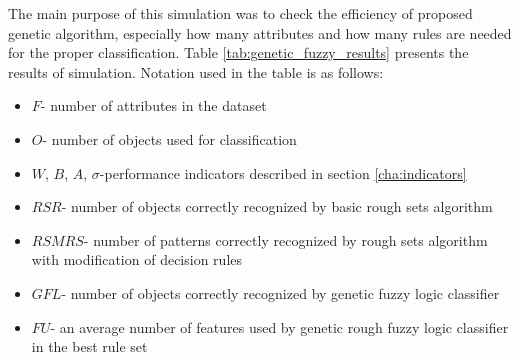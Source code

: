 The main purpose of this simulation was to check the efficiency of proposed
genetic algorithm, especially how many attributes and how many rules are needed 
for the proper classification. Table \ref{tab:genetic_fuzzy_results} presents
the results of simulation. Notation used in the table is as follows:
\begin{itemize}
    \item $F$- number of attributes in the dataset
    \item $O$- number of objects used for classification
    \item $W$, $B$, $A$, $\sigma$-performance indicators described in section \ref{cha:indicators}
    \item $RSR$- number of objects correctly recognized by basic rough sets algorithm
    \item $RSMRS$- number of patterns correctly recognized by rough sets algorithm
        with modification of decision rules
    \item $GFL$- number of objects correctly recognized by genetic fuzzy logic
        classifier
    \item $FU$- an average number of features used by genetic rough fuzzy logic classifier
        in the best rule set
\end{itemize}
